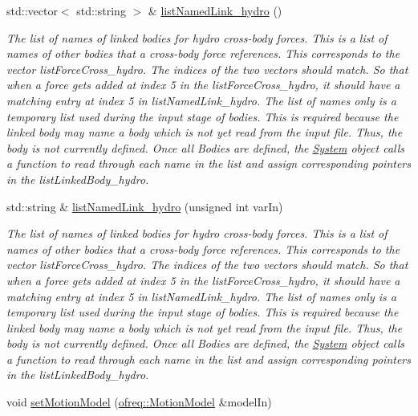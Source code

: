 \begin{DoxyCompactItemize}
std\-::vector$<$ std\-::string $>$ \& \hyperlink{classosea_1_1ofreq_1_1_body_abc4abd052a3776123df114c6faf34bae}{list\-Named\-Link\-\_\-hydro} ()
\begin{DoxyCompactList}\small\item\em The list of names of linked bodies for hydro cross-\/body forces. This is a list of names of other bodies that a cross-\/body force references. This corresponds to the vector list\-Force\-Cross\-\_\-hydro. The indices of the two vectors should match. So that when a force gets added at index 5 in the list\-Force\-Cross\-\_\-hydro, it should have a matching entry at index 5 in list\-Named\-Link\-\_\-hydro. The list of names only is a temporary list used during the input stage of bodies. This is required because the linked body may name a body which is not yet read from the input file. Thus, the body is not currently defined. Once all Bodies are defined, the \hyperlink{classosea_1_1ofreq_1_1_system}{System} object calls a function to read through each name in the list and assign corresponding pointers in the list\-Linked\-Body\-\_\-hydro. \end{DoxyCompactList}\item 
std\-::string \& \hyperlink{classosea_1_1ofreq_1_1_body_ad01b96bf575dde9f75f489c7118ca574}{list\-Named\-Link\-\_\-hydro} (unsigned int var\-In)
\begin{DoxyCompactList}\small\item\em The list of names of linked bodies for hydro cross-\/body forces. This is a list of names of other bodies that a cross-\/body force references. This corresponds to the vector list\-Force\-Cross\-\_\-hydro. The indices of the two vectors should match. So that when a force gets added at index 5 in the list\-Force\-Cross\-\_\-hydro, it should have a matching entry at index 5 in list\-Named\-Link\-\_\-hydro. The list of names only is a temporary list used during the input stage of bodies. This is required because the linked body may name a body which is not yet read from the input file. Thus, the body is not currently defined. Once all Bodies are defined, the \hyperlink{classosea_1_1ofreq_1_1_system}{System} object calls a function to read through each name in the list and assign corresponding pointers in the list\-Linked\-Body\-\_\-hydro. \end{DoxyCompactList}\item 
void \hyperlink{classosea_1_1ofreq_1_1_body_a25b6fa24ac6237272494a7f74a348145}{set\-Motion\-Model} (\hyperlink{classosea_1_1ofreq_1_1_motion_model}{ofreq\-::\-Motion\-Model} \&model\-In)

\end{DoxyCompactItemize}
